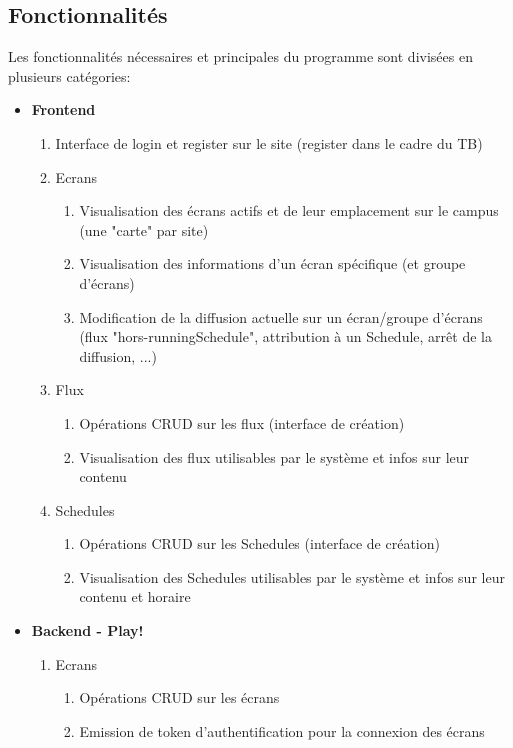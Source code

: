 \documentclass[french]{article}
\begin{document}
\subsection{Fonctionnalités}
Les fonctionnalités nécessaires et principales du programme sont divisées en plusieurs catégories:
\begin{itemize}
	\item \textbf{Frontend}
	\begin{enumerate}
		\item Interface de login et register sur le site (register dans le cadre du TB)
		\item Ecrans
		\begin{enumerate}
			\item Visualisation des écrans actifs et de leur emplacement sur le campus (une "carte" par site)
			\item Visualisation des informations d'un écran spécifique (et groupe d'écrans)
			\item Modification de la diffusion actuelle sur un écran/groupe d'écrans (flux "hors-runningSchedule", attribution à un Schedule, arrêt de la diffusion, ...)
		\end{enumerate}
		\item Flux
		\begin{enumerate}
			\item Opérations CRUD sur les flux (interface de création)
			\item Visualisation des flux utilisables par le système et infos sur leur contenu
		\end{enumerate}
		\item Schedules
		\begin{enumerate}
			\item Opérations CRUD sur les Schedules (interface de création)
			\item Visualisation des Schedules utilisables par le système et infos sur leur contenu et horaire
		\end{enumerate}
		\end{enumerate}
	\item \textbf{Backend - Play!}
	\begin{enumerate}
		\item Ecrans
		\begin{enumerate}
			\item Opérations CRUD sur les écrans
			\item Emission de token d'authentification pour la connexion des écrans
		\end{enumerate}

\end{enumerate}
\end{itemize}
\end{document}
